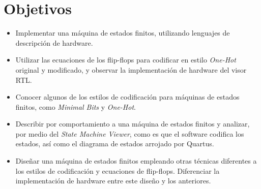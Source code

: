 \section{Objetivos \label{sec:obj}}


\begin{itemize} 
	\item Implementar una máquina de estados finitos, utilizando lenguajes de descripción de hardware.
	
	\item Utilizar las ecuaciones de los flip-flops para codificar en estilo \textit{One-Hot} original y modificado, y observar la implementación de hardware del visor RTL.
	
	\item Conocer algunos de los estilos de codificación para máquinas de estados finitos, como \textit{Minimal Bits} y \textit{One-Hot}.
	
	\item Describir por comportamiento a una máquina de estados finitos y analizar, por medio del \textit{State Machine Viewer}, como es que el software codifica los estados, así como el diagrama de estados arrojado por Quartus.
	
	\item Diseñar una máquina de estados finitos empleando otras técnicas diferentes a los estilos de codificación y ecuaciones de flip-flops. Diferenciar la implementación de hardware entre este diseño y los anteriores.
\end{itemize}